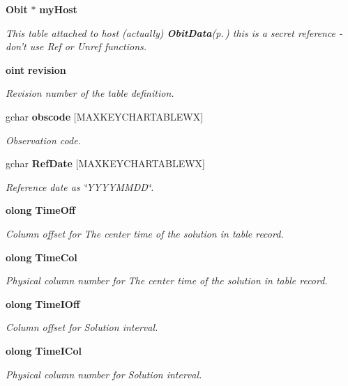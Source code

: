 \begin{CompactItemize}
{\bf Obit} $\ast$ {\bf my\-Host}
\begin{CompactList}\small\item\em This table attached to host (actually) {\bf Obit\-Data}{\rm (p.\,\pageref{structObitData})} this is a secret reference - don't use Ref or Unref functions. \item\end{CompactList}\item 
{\bf oint} {\bf revision}
\begin{CompactList}\small\item\em Revision number of the table definition. \item\end{CompactList}\item 
gchar {\bf obscode} [MAXKEYCHARTABLEWX]
\begin{CompactList}\small\item\em Observation code. \item\end{CompactList}\item 
gchar {\bf Ref\-Date} [MAXKEYCHARTABLEWX]
\begin{CompactList}\small\item\em Reference date as \char`\"{}YYYYMMDD\char`\"{}. \item\end{CompactList}\item 
{\bf olong} {\bf Time\-Off}
\begin{CompactList}\small\item\em Column offset for The center time of the solution in table record. \item\end{CompactList}\item 
{\bf olong} {\bf Time\-Col}
\begin{CompactList}\small\item\em Physical column number for The center time of the solution in table record. \item\end{CompactList}\item 
{\bf olong} {\bf Time\-IOff}
\begin{CompactList}\small\item\em Column offset for Solution interval. \item\end{CompactList}\item 
{\bf olong} {\bf Time\-ICol}
\begin{CompactList}\small\item\em Physical column number for Solution interval. \item\end{CompactList}\item 

\end{CompactItemize}
